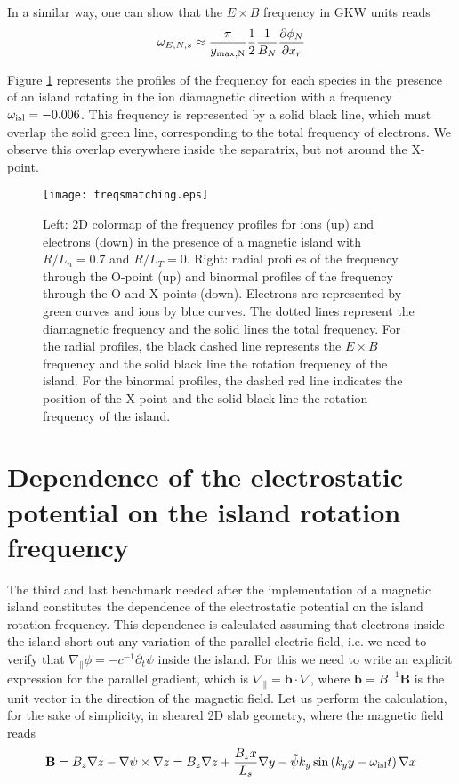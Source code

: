 In a similar way, one can show that the $E\times B$ frequency in GKW units reads
\begin{equation}
\omega_{E,N,s} \approx {\pi\over y_{\rm max,N}}{1\over 2}{1\over B_N}{\partial\phi_{N}\over\partial x_r}
\end{equation}

Figure \ref{fig:freqsmatching} represents the profiles of the frequency for each species in the presence of an island rotating in the ion diamagnetic direction with a frequency $\omega_{\rm isl} = -0.006$. This frequency is represented by a solid black line, which must overlap the solid green line, corresponding to the total frequency of electrons. We observe this overlap everywhere inside the separatrix, but not around the X-point.

\begin{figure}
\begin{center}
\texttt{[image: freqsmatching.eps]}
\caption{Left: 2D colormap of the frequency profiles for ions (up) and electrons (down) in the presence of a magnetic island with $R/L_n=0.7$ and $R/L_T=0$. Right: radial profiles of the frequency through the O-point (up) and binormal profiles of the frequency through the O and X points (down). Electrons are represented by green curves and ions by blue curves. The dotted lines represent the diamagnetic frequency and the solid lines the total frequency. For the radial profiles, the black dashed line represents the $E\times B$ frequency and the solid black line the rotation frequency of the island. For the binormal profiles, the dashed red line indicates the position of the X-point and the solid black line the rotation frequency of the island.}
\label{fig:freqsmatching}
\end{center}
\end{figure}

\section{Dependence of the electrostatic potential on the island rotation frequency}

The third and last benchmark needed after the implementation of a magnetic island constitutes the dependence of the electrostatic potential on the island rotation frequency. This dependence is calculated assuming that
 electrons inside the island short out any variation of the parallel electric field, i.e. we need to verify that $\nabla_\parallel\phi=-c^{-1}\partial_t \psi$ inside the island.
  For this we need to write an explicit expression for the parallel gradient, which is $\nabla_\parallel = \mathbf{b}\cdot\nabla$, where $\mathbf{b}=B^{-1}\mathbf{B}$ is the unit vector in the direction of the magnetic field.
  Let us perform the calculation, for the sake of simplicity, in sheared 2D slab geometry, where the magnetic field reads
  \begin{equation}
  \mathbf{B} = B_z\nabla z - \nabla\psi\times\nabla z = B_z\nabla z + {B_z x \over L_s}\nabla y - \tilde\psi k_y\sin\left(k_yy-\omega_{\rm isl}t\right)\nabla x
  \end{equation}

